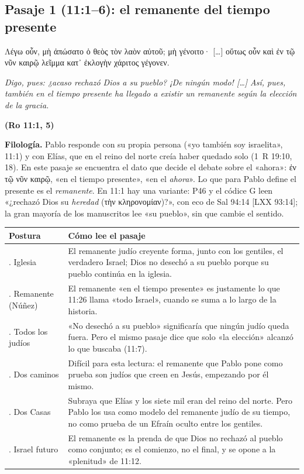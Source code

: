 \documentclass[11pt,letterpaper]{article}
\newcommand{\grc}[1]{\foreignlanguage{ancientgreek}{#1}}
\newcommand{\fuente}[1]{\par\hfill{\upshape\bfseries\small\textcolor{ladrillo}{#1}}}
\begin{document}
\subsection{Pasaje 1 (11:1--6): el remanente del tiempo presente}

\begin{cita}[fontupper=\upshape]
\grc{Λέγω οὖν, μὴ ἀπώσατο ὁ θεὸς τὸν λαὸν αὐτοῦ; μὴ γένοιτο· [\ldots] οὕτως οὖν καὶ ἐν τῷ νῦν καιρῷ λεῖμμα κατ᾿ ἐκλογὴν χάριτος γέγονεν.}\par\smallskip
\itshape Digo, pues: ¿acaso rechazó Dios a su pueblo? ¡De ningún modo! [\ldots] Así, pues, también en el tiempo presente ha llegado a existir un remanente según la elección de la gracia.\fuente{(Ro 11:1, 5)}
\end{cita}

\textbf{Filología.} Pablo responde con su propia persona («yo también soy israelita», 11:1) y con Elías, que en el reino del norte creía haber quedado solo (1~R 19:10, 18). En este pasaje se encuentra el dato que decide el debate sobre el «ahora»: \grc{ἐν τῷ νῦν καιρῷ}, «en el tiempo presente», «en el \emph{ahora}». Lo que para Pablo define el presente es el \emph{remanente}. En 11:1 hay una variante: P46 y el códice G leen «¿rechazó Dios su \emph{heredad} (\grc{τὴν κληρονομίαν})?», con eco de Sal 94:14 [LXX 93:14]; la gran mayoría de los manuscritos lee «su pueblo», sin que cambie el sentido.

\begin{center}\footnotesize
\renewcommand{\arraystretch}{1.25}
\begin{tabular}{>{\RaggedRight\arraybackslash}p{2.9cm}>{\RaggedRight\arraybackslash}p{11.1cm}}
\toprule
\textbf{Postura} & \textbf{Cómo lee el pasaje}\\
\midrule
1. Iglesia & El remanente judío creyente forma, junto con los gentiles, el verdadero Israel; Dios no desechó a su pueblo porque su pueblo continúa en la iglesia.\\
2. Remanente (Núñez) & El remanente «en el tiempo presente» es justamente lo que 11:26 llama «todo Israel», cuando se suma a lo largo de la historia.\\
3. Todos los judíos & «No desechó a su pueblo» significaría que ningún judío queda fuera. Pero el mismo pasaje dice que solo «la elección» alcanzó lo que buscaba (11:7).\\
4. Dos caminos & Difícil para esta lectura: el remanente que Pablo pone como prueba son judíos que creen en Jesús, empezando por él mismo.\\
5. Dos Casas & Subraya que Elías y los siete mil eran del reino del norte. Pero Pablo los usa como modelo del remanente judío de su tiempo, no como prueba de un Efraín oculto entre los gentiles.\\
6. Israel futuro & El remanente es la prenda de que Dios no rechazó al pueblo como conjunto; es el comienzo, no el final, y se opone a la «plenitud» de 11:12.\\
\bottomrule
\end{tabular}\end{center}
\end{document}
